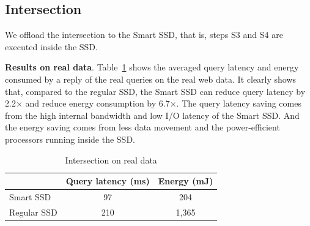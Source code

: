 


\subsection{Intersection}\label{sec:expIntersection}
We offload the \textsf{intersection} to the Smart SSD, that is, steps S3 and S4 are executed inside the SSD.

\textbf{Results on real data}.
Table~\ref{tab:interRealData} shows the averaged query latency and energy consumed by a reply of the real queries on the real web data. It clearly shows that, compared to the regular SSD,  the Smart SSD can reduce query latency by 2.2$\times$ and reduce energy consumption by 6.7$\times$. The query latency saving comes from the high internal bandwidth and low I/O latency of  the Smart SSD. And the energy saving comes from less data movement and the power-efficient processors running inside the SSD.

\begin{table}[tbp]\small
\centering
\begin{tabular}{l|c|c}\hline\hline
& \textbf{Query latency (ms)} & \textbf{Energy (mJ)}\\\hline
Smart SSD & 97 & 204\\\hline
Regular SSD & 210 & 1,365 \\\hline\hline
\end{tabular}
\caption{Intersection on real data}\label{tab:interRealData}
\end{table}

